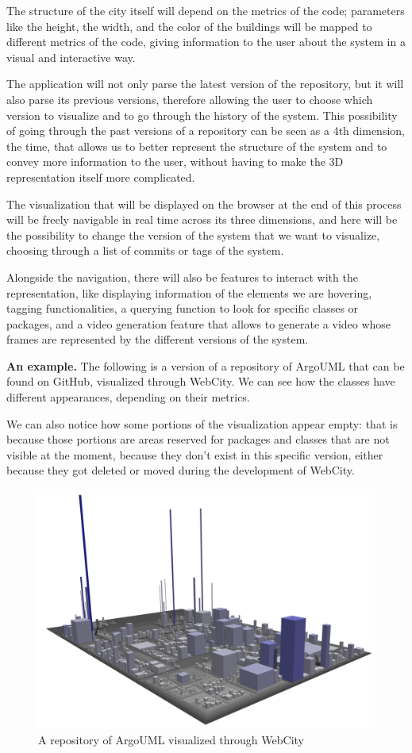 \documentclass[]{usiinfbachelorproject}
\begin{document}
The structure of the city itself will depend on the metrics of the code; parameters like the height, the width, and the color of the buildings will be mapped to different metrics of the code, giving information to the user about the system in a visual and interactive way.

The application will not only parse the latest version of the repository, but it will also parse its previous versions, therefore allowing the user to choose which version to visualize and to go through the history of the system. This possibility of going through the past versions of a repository can be seen as a 4th dimension, the time, that allows us to better represent the structure of the system and to convey more information to the user, without having to make the 3D representation itself more complicated.

The visualization that will be displayed on the browser at the end of this process will be freely navigable in real time across its three dimensions, and here will be the possibility to change the version of the system that we want to visualize, choosing through a list of commits or tags of the system.

Alongside the navigation, there will also be features to interact with the representation, like displaying information of the elements we are hovering, tagging functionalities, a querying function to look for specific classes or packages, and a video generation feature that allows to generate a video whose frames are represented by the different versions of the system.

%

\textbf{An example.} The following is a version of a repository of ArgoUML that can be found on GitHub, visualized through WebCity. We can see how the classes have different appearances, depending on their metrics.

We can also notice how some portions of the visualization appear empty: that is because those portions are areas reserved for packages and classes that are not visible at the moment, because they don't exist in this specific version, either because they got deleted or moved during the development of WebCity.
\begin{figure} [H]
\centering
\includegraphics[width=.8\textwidth]{pictures/example.png}
\caption{A repository of ArgoUML visualized through WebCity}
\label{fig:example}
\end{figure}
\end{document}
